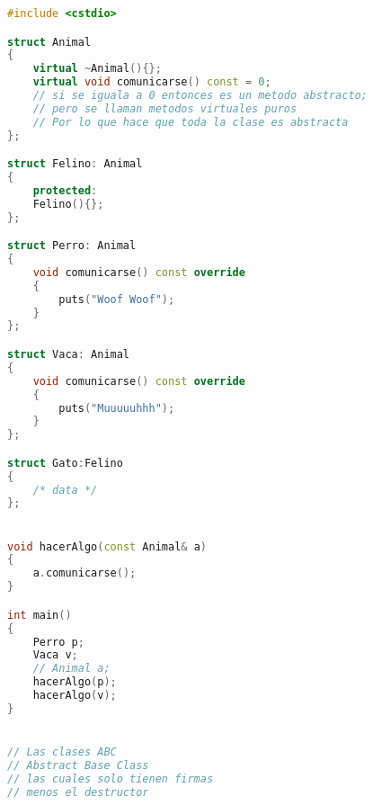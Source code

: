 \begin{lstlisting}[language=C++, caption={Polimorfismo 2}]
#include <cstdio>

struct Animal
{
    virtual ~Animal(){};
    virtual void comunicarse() const = 0;
    // si se iguala a 0 entonces es un metodo abstracto;
    // pero se llaman metodos virtuales puros
    // Por lo que hace que toda la clase es abstracta
};

struct Felino: Animal
{
    protected:
    Felino(){};
};

struct Perro: Animal
{
    void comunicarse() const override
    {
        puts("Woof Woof");
    }
};

struct Vaca: Animal
{
    void comunicarse() const override
    {
        puts("Muuuuuhhh");
    }
};

struct Gato:Felino
{
    /* data */
};


void hacerAlgo(const Animal& a)
{
    a.comunicarse();
}

int main()
{
    Perro p;
    Vaca v;
    // Animal a;
    hacerAlgo(p);
    hacerAlgo(v);
}


// Las clases ABC
// Abstract Base Class
// las cuales solo tienen firmas
// menos el destructor
\end{lstlisting}
